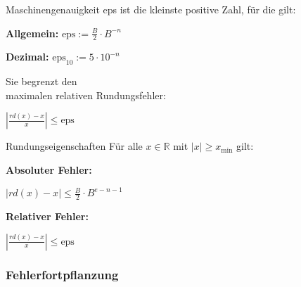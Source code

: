 \begin{lemma}{Maschinengenauigkeit} 
    eps ist die kleinste positive Zahl, für die gilt:
    \vspace{-3mm}\\
\begin{minipage}[b]{0.45\textwidth}
    \textbf{Allgemein:}  $\text{eps} := \frac{B}{2} \cdot B^{-n}$
\end{minipage}
\hspace{6mm}
\begin{minipage}[b]{0.45\textwidth}
    \textbf{Dezimal:}  $\text{eps}_{10} := 5 \cdot 10^{-n}$
\end{minipage}

\begin{minipage}[t]{0.6\textwidth}
    Sie begrenzt den\\ maximalen relativen Rundungsfehler:
\end{minipage}
\begin{minipage}{0.35\textwidth}
    \vspace{1mm}
    $\left|\frac{rd(x)-x}{x}\right| \leq \text{eps}$
\end{minipage}
\end{lemma}

\begin{corollary}{Rundungseigenschaften}
Für alle $x \in \mathbb{R}$ mit $|x| \geq x_{\text{min}}$ gilt:
\vspace{1mm}\\
\begin{minipage}[t]{0.45\textwidth}
    \textbf{Absoluter Fehler:}  
    \begin{center} $|rd(x) - x| \leq \frac{B}{2} \cdot B^{e-n-1}$ \end{center}
\end{minipage}
\hspace{3mm}
\begin{minipage}[t]{0.35\textwidth}
    \textbf{Relativer Fehler:}  
    \begin{center} $\left|\frac{rd(x)-x}{x}\right| \leq \text{eps}$ \end{center}
\end{minipage}
\end{corollary}

\subsubsection{Fehlerfortpflanzung}

